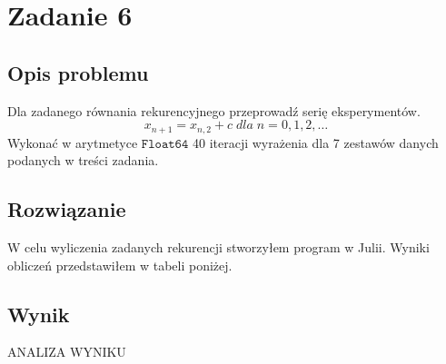 \section{Zadanie 6}
\subsection{Opis problemu}
Dla zadanego równania rekurencyjnego przeprowadź serię eksperymentów.
$$ x_{n+1} = x_{n,2} + c\; dla\; n = 0, 1, 2,\ldots$$
Wykonać w arytmetyce $ \mathtt{Float64} $ 40 iteracji wyrażenia dla 7 zestawów danych podanych w treści zadania.

\subsection{Rozwiązanie}
W celu wyliczenia zadanych rekurencji stworzyłem program w Julii. Wyniki obliczeń przedstawiłem w tabeli poniżej.
\subsection{Wynik}
\begin{center}
    
\end{center}

ANALIZA WYNIKU